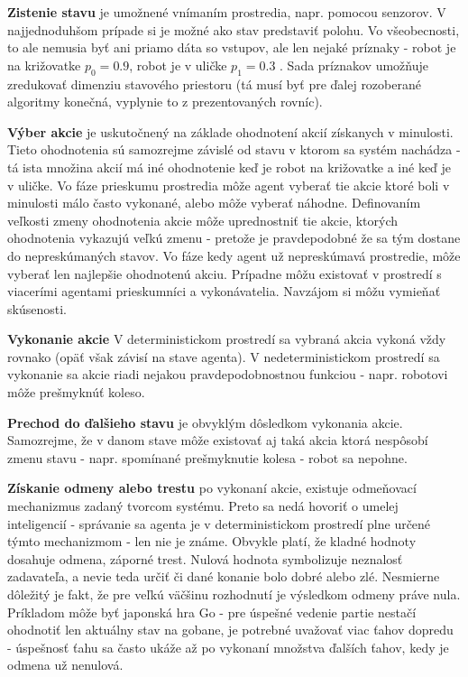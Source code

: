  {\bf Zistenie stavu} je umožnené vnímaním prostredia, napr. pomocou senzorov.
V najjednoduhšom prípade si je možné ako stav predstaviť polohu. Vo
všeobecnosti, to ale nemusia byť ani priamo dáta so vstupov, ale len nejaké
príznaky - robot je na križovatke $p_0 = 0.9$, robot je v uličke $p_1 = 0.3$ .
Sada príznakov umožňuje zredukovať dimenziu stavového priestoru (tá musí
byť pre ďalej rozoberané algoritmy konečná, vyplynie to z prezentovaných rovníc).

{\bf Výber akcie} je uskutočnený na základe ohodnotení akcií získanych
v minulosti. Tieto ohodnotenia sú samozrejme závislé od stavu v ktorom sa
systém nachádza - tá ista množina akcií má iné ohodnotenie keď je robot na
križovatke a iné keď je v uličke. Vo fáze prieskumu prostredia môže agent
vyberať tie akcie ktoré boli v minulosti málo často vykonané, alebo môže vyberať náhodne.
Definovaním veľkosti zmeny ohodnotenia akcie môže uprednostniť tie akcie,
ktorých ohodnotenia vykazujú veľkú zmenu - pretože je pravdepodobné že sa
tým dostane do nepreskúmaných stavov.
Vo fáze kedy agent už nepreskúmavá prostredie, môže vyberať len najlepšie ohodnotenú akciu.
Prípadne môžu existovať v prostredí s viacerími agentami prieskumníci a vykonávatelia.
Navzájom si môžu vymieňať skúsenosti.

{\bf Vykonanie akcie} V deterministickom prostredí sa vybraná akcia vykoná vždy rovnako
(opäť však závisí na stave agenta). V nedeterministickom prostredí sa vykonanie
sa akcie riadi nejakou pravdepodobnostnou funkciou - napr. robotovi môže prešmyknúť
koleso.

{\bf Prechod do ďalšieho stavu} je obvyklým dôsledkom vykonania akcie. Samozrejme, že
v danom stave môže existovať aj taká akcia ktorá nespôsobí zmenu stavu - napr. spomínané
prešmyknutie kolesa - robot sa nepohne.

{\bf Získanie odmeny alebo trestu} po vykonaní akcie, existuje odmeňovací mechanizmus
zadaný tvorcom systému. Preto sa nedá hovoriť o umelej inteligencií - správanie
sa agenta je v deterministickom prostredí plne určené týmto mechanizmom - len nie je známe.
Obvykle platí, že kladné hodnoty dosahuje odmena, záporné trest. Nulová hodnota symbolizuje
neznalosť zadavateľa, a nevie teda určiť či dané konanie bolo dobré alebo zlé.
Nesmierne dôležitý je fakt, že pre veľkú väčšinu rozhodnutí je výsledkom odmeny práve nula.
Príkladom môže byť japonská hra Go - pre úspešné vedenie partie nestačí ohodnotiť
len aktuálny stav na gobane, je potrebné uvažovať viac ťahov dopredu - úspešnosť
ťahu sa často ukáže až po vykonaní množstva ďalších ťahov, kedy je odmena už nenulová.

